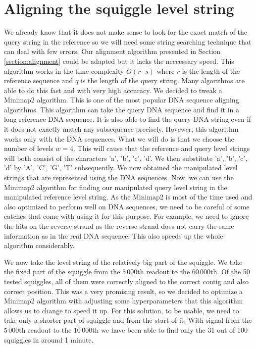 \section{Aligning the squiggle level string}
\label{section:alignMinimap}

We already know that it does not make sense to look for the exact match of the query string in the reference
so we will need some string searching technique that can deal with few errors.
Our alignment algorithm presented in Section \ref{section:alignment} could be adapted but it lacks the neccessary speed. This
algorithm works in the time complexity $O(r\cdot s)$ where $r$ is the length of the
reference sequence and $q$ is the length of the query string. Many algorithms are able
to do this fast and with very high accuracy. We decided to tweak a Minimap2 \cite{li2018minimap2} algorithm. This is
one of the most popular DNA sequence aligning algorithms. This algorithm can take the
query DNA sequence and find it in a long reference DNA sequence. It is also able to
find the query DNA string even if it does not exactly match any subsequence precisely.
Hovewer, this algorithm works only with the DNA sequences. What we will do is that we choose
the number of levels $w=4$. This will cause that the reference and query level strings will both consist of
the characters 'a', 'b', 'c', 'd'. We then substitute 'a', 'b', 'c', 'd' by
'A', 'C', 'G', 'T' subsequently. We now obtained the manipulated level strings that
are represented using the DNA sequences. Now, we can use the Minimap2 algorithm for
finding our manipulated query level string in the manipulated reference level string.
As the Minimap2 is most of the time used and also optimized to perform well on DNA
sequences, we need to be careful of some catches that come with using it for this
purpose. For example, we need to ignore the hits on the reverse strand as the
reverse strand does not carry the same information as in the real DNA sequence.
This also speeds up the whole algorithm considerably.

We now take the level string of the relatively big part of the squiggle. We take the
fixed part of the squiggle from the $5\,000$th readout to the $60\,000$th. Of the 50
tested squiggles, all of them were correctly aligned to the correct contig and also
correct position. This was a very promising result, so we decided to optimize a
Minimap2 algorithm with adjusting some hyperparameters that this algorithm allows us
to change to speed it up. For this solution, to be usable, we need to take only
a shorter part of squiggle and from the start of it. With signal from the $5\,000$th
readout to the $10\,000$th we have been able to find only the 31 out of 100 squiggles
in around 1 minute.

